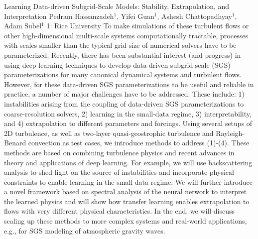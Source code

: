 \vspace{1.5ex}
\abs
{Learning Data-driven Subgrid-Scale Models: Stability, Extrapolation, and Interpretation}
{Pedram Hassanzadeh$^{1}$, Yifei Guan$^{1}$,  Ashesh Chattopadhyay$^{1}$, Adam Subel$^{1}$ }
{1: Rice University}
{To make simulations of these turbulent flows or other high-dimensional multi-scale systems computationally tractable, processes with scales smaller than the typical grid size of numerical solvers have to be parameterized. Recently, there has been substantial interest (and progress) in using deep learning techniques to develop data-driven subgrid-scale (SGS) parameterizations for many canonical dynamical systems and turbulent flows. However, for these data-driven SGS parameterizations to be useful and reliable in practice, a number of major challenges have to be addressed. These include: 1) instabilities arising from the coupling of data-driven SGS parameterizations to coarse-resolution solvers, 2) learning in the small-data regime, 3) interpretability, and 4) extrapolation to different parameters and forcings. Using several setups of 2D turbulence, as well as two-layer quasi-geostrophic turbulence and Rayleigh-Benard convection as test cases, we introduce methods to address (1)-(4). These methods are based on combining turbulence physics and recent advances in theory and applications of deep learning. For example, we will use backscattering analysis to shed light on the source of instabilities and incorporate physical constraints to enable learning in the small-data regime. We will further introduce a novel framework based on spectral analysis of the neural network to interpret the learned physics and will show how transfer learning enables extrapolation to flows with very different physical characteristics. In the end, we will discuss scaling up these methods to more complex systems and real-world applications, e.g., for SGS modeling of atmospheric gravity waves.}


